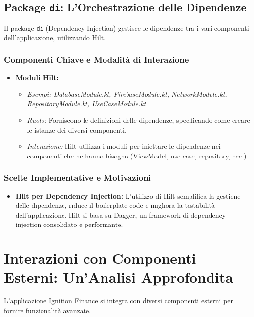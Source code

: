 \documentclass{article}
\begin{document}
\subsection{Package \texttt{di}: L'Orchestrazione delle Dipendenze}

Il package \texttt{di} (Dependency Injection) gestisce le dipendenze tra i vari componenti dell'applicazione, utilizzando Hilt.

\subsubsection{Componenti Chiave e Modalità di Interazione}

\begin{itemize}
    \item \textbf{Moduli Hilt:}
    \begin{itemize}
        \item \textit{Esempi: DatabaseModule.kt, FirebaseModule.kt, NetworkModule.kt, RepositoryModule.kt, UseCaseModule.kt}
        \item \textit{Ruolo:} Forniscono le definizioni delle dipendenze, specificando come creare le istanze dei diversi componenti.
        \item \textit{Interazione:} Hilt utilizza i moduli per iniettare le dipendenze nei componenti che ne hanno bisogno (ViewModel, use case, repository, ecc.).
    \end{itemize}
\end{itemize}

\subsubsection{Scelte Implementative e Motivazioni}

\begin{itemize}
    \item \textbf{Hilt per Dependency Injection:} L'utilizzo di Hilt semplifica la gestione delle dipendenze, riduce il boilerplate code e migliora la testabilità dell'applicazione. Hilt si basa su Dagger, un framework di dependency injection consolidato e performante.
\end{itemize}

\section{Interazioni con Componenti Esterni: Un'Analisi Approfondita}

L'applicazione Ignition Finance si integra con diversi componenti esterni per fornire funzionalità avanzate.
\end{document}
